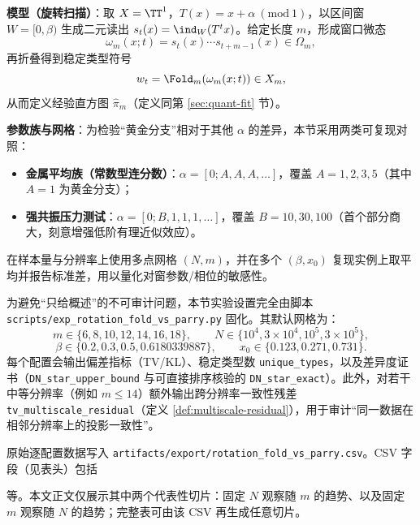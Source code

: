 \textbf{模型（旋转扫描）}：取 $X=\TT^1$，$T(x)=x+\alpha\ (\mathrm{mod}\ 1)$，以区间窗 $W=[0,\beta)$ 生成二元读出 $s_t(x)=\ind_W(T^t x)$。给定长度 $m$，形成窗口微态
\[
\omega_m(x;t)=s_t(x)\cdots s_{t+m-1}(x)\in\Omega_m,
\]
再折叠得到稳定类型符号
\[
w_t=\Fold_m(\omega_m(x;t))\in X_m,
\]
从而定义经验直方图 $\hat{\pi}_m$（定义同第 \ref{sec:quant-fit} 节）。

\textbf{参数族与网格}：为检验“黄金分支”相对于其他 $\alpha$ 的差异，本节采用两类可复现对照：
\begin{itemize}
  \item \textbf{金属平均族（常数型连分数）}：$\alpha=[0;A,A,A,\dots]$，覆盖 $A=1,2,3,5$（其中 $A=1$ 为黄金分支）；
  \item \textbf{强共振压力测试}：$\alpha=[0;B,1,1,1,\dots]$，覆盖 $B=10,30,100$（首个部分商大，刻意增强低阶有理近似效应）。
\end{itemize}
在样本量与分辨率上使用多点网格 $(N,m)$，并在多个 $(\beta,x_0)$ 复现实例上取平均并报告标准差，用以量化对窗参数/相位的敏感性。

\begin{remark}[数据与方案的脚本精确口径]\label{rem:exp-script-spec}
为避免“只给概述”的不可审计问题，本节实验设置完全由脚本 \verb|scripts/exp_rotation_fold_vs_parry.py| 固化。其默认网格为：
\[
m\in\{6,8,10,12,14,16,18\},\qquad
N\in\{10^4,3\times 10^4,10^5,3\times 10^5\},
\]
\[
\beta\in\{0.2,0.3,0.5,0.6180339887\},\qquad
x_0\in\{0.123,0.271,0.731\}.
\]
每个配置会输出偏差指标（TV/KL）、稳定类型数 \texttt{unique\_types}，以及差异度证书（\texttt{DN\_star\_upper\_bound} 与可直接排序核验的 \texttt{DN\_star\_exact}）。此外，对若干中等分辨率（例如 $m\le 14$）额外输出跨分辨率一致性残差 \texttt{tv\_multiscale\_residual}（定义 \ref{def:multiscale-residual}），用于审计“同一数据在相邻分辨率上的投影一致性”。
\end{remark}

\begin{remark}[原始数据文件与字段说明]\label{rem:exp-data-files}
\begin{sloppypar}
原始逐配置数据写入 \texttt{artifacts/export/rotation\_fold\_vs\_parry.csv}。CSV 字段（见表头）包括
\begin{center}
\end{center}
等。本文正文仅展示其中两个代表性切片：固定 $N$ 观察随 $m$ 的趋势、以及固定 $m$ 观察随 $N$ 的趋势；完整表可由该 CSV 再生成任意切片。
\end{sloppypar}
\end{remark}

